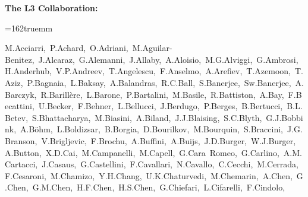 \documentclass[12pt,a4paper,dvips]{article}
\begin{document}
{
\parskip=0pt
%
\noindent
{\bf The L3 Collaboration:}
\ifx\selectfont\undefined%
 \baselineskip=10.8pt
 \baselineskip\baselinestretch\baselineskip
 \normalbaselineskip\baselineskip
 \ixpt
\else%
 \fontsize{9}{10.8pt}\selectfont
\fi
%
\medskip
{}
\raggedright
\hsize=162truemm\hoffset=0mm
%
\def\r{\rlap,}
\noindent

M.Acciarri\r\tute\milan\
P.Achard\r\tute\geneva\ 
O.Adriani\r\tute{\florence}\ 
M.Aguilar-Benitez\r\tute\madrid\ 
J.Alcaraz\r\tute\madrid\ 
G.Alemanni\r\tute\lausanne\
J.Allaby\r\tute\cern\
A.Aloisio\r\tute\naples\ 
M.G.Alviggi\r\tute\naples\
G.Ambrosi\r\tute\geneva\
H.Anderhub\r\tute\eth\ 
V.P.Andreev\r\tute{\lsu,\peters}\
T.Angelescu\r\tute\bucharest\
F.Anselmo\r\tute\bologna\
A.Arefiev\r\tute\moscow\ 
T.Azemoon\r\tute\mich\ 
T.Aziz\r\tute{\tata}\ 
P.Bagnaia\r\tute{\rome}\
L.Baksay\r\tute\alabama\
A.Balandras\r\tute\lapp\ 
R.C.Ball\r\tute\mich\ 
S.Banerjee\r\tute{\tata}\ 
Sw.Banerjee\r\tute\tata\ 
A.Barczyk\r\tute{\eth,\psinst}\ 
R.Barill\`ere\r\tute\cern\ 
L.Barone\r\tute\rome\ 
P.Bartalini\r\tute\lausanne\ 
M.Basile\r\tute\bologna\
R.Battiston\r\tute\perugia\
A.Bay\r\tute\lausanne\ 
F.Becattini\r\tute\florence\
U.Becker\r\tute{\mit}\
F.Behner\r\tute\eth\
L.Bellucci\r\tute\florence\ 
J.Berdugo\r\tute\madrid\ 
P.Berges\r\tute\mit\ 
B.Bertucci\r\tute\perugia\
B.L.Betev\r\tute{\eth}\
S.Bhattacharya\r\tute\tata\
M.Biasini\r\tute\perugia\
A.Biland\r\tute\eth\ 
J.J.Blaising\r\tute{\lapp}\ 
S.C.Blyth\r\tute\cmu\ 
G.J.Bobbink\r\tute{\nikhef}\ 
A.B\"ohm\r\tute{\aachen}\
L.Boldizsar\r\tute\budapest\
B.Borgia\r\tute{\rome}\ 
D.Bourilkov\r\tute\eth\
M.Bourquin\r\tute\geneva\
S.Braccini\r\tute\geneva\
J.G.Branson\r\tute\ucsd\
V.Brigljevic\r\tute\eth\ 
F.Brochu\r\tute\lapp\ 
A.Buffini\r\tute\florence\
A.Buijs\r\tute\utrecht\
J.D.Burger\r\tute\mit\
W.J.Burger\r\tute\perugia\
A.Button\r\tute\mich\ 
X.D.Cai\r\tute\mit\ 
M.Campanelli\r\tute\eth\
M.Capell\r\tute\mit\
G.Cara~Romeo\r\tute\bologna\
G.Carlino\r\tute\naples\
A.M.Cartacci\r\tute\florence\ 
J.Casaus\r\tute\madrid\
G.Castellini\r\tute\florence\
F.Cavallari\r\tute\rome\
N.Cavallo\r\tute\naples\
C.Cecchi\r\tute\perugia\ 
M.Cerrada\r\tute\madrid\
F.Cesaroni\r\tute\lecce\ 
M.Chamizo\r\tute\geneva\
Y.H.Chang\r\tute\taiwan\ 
U.K.Chaturvedi\r\tute\wl\ 
M.Chemarin\r\tute\lyon\
A.Chen\r\tute\taiwan\ 
G.Chen\r\tute{\beijing}\ 
G.M.Chen\r\tute\beijing\ 
H.F.Chen\r\tute\hefei\ 
H.S.Chen\r\tute\beijing\
G.Chiefari\r\tute\naples\ 
L.Cifarelli\r\tute\salerno\
F.Cindolo\r\tute\bologna\
}
\end{document}
